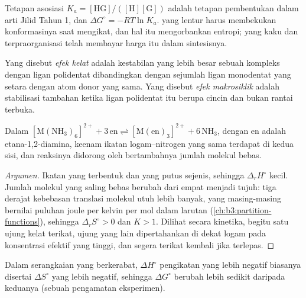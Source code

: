 Tetapan asosiasi $K_a = [\mathrm{HG}]/([\mathrm H][\mathrm G])$ adalah tetapan pembentukan dalam arti
Jilid Tahun 1, dan $\Delta G^\circ = -RT\ln K_a$.  yang lentur harus membekukan
konformasinya saat mengikat, dan hal itu mengorbankan entropi;  yang kaku dan terpraorganisasi telah
membayar harga itu dalam sintesisnya.

\begin{definition}\label{def:b3:supramolecular:macrocyclic}
Yang disebut \emph{efek kelat} adalah kestabilan yang lebih besar sebuah
kompleks dengan ligan polidentat dibandingkan dengan sejumlah ligan
monodentat yang setara dengan atom donor yang sama. Yang disebut \emph{efek
makrosiklik} adalah stabilisasi tambahan ketika
ligan polidentat itu berupa cincin dan bukan rantai terbuka.
\end{definition}

\begin{proposition}\label{prop:b3:supramolecular:chelate-entropy}
Dalam $\mathrm{[M(NH_3)_6]^{2+} + 3\,en \rightleftharpoons [M(en)_3]^{2+} + 6\,NH_3}$, dengan en adalah etana-1,2-diamina, keenam
ikatan logam--nitrogen yang sama terdapat di kedua sisi, dan reaksinya didorong oleh
bertambahnya jumlah molekul bebas.
\end{proposition}

\begin{proof}[Argumen]
Ikatan yang terbentuk dan yang putus sejenis, sehingga $\Delta_rH^\circ$ kecil. Jumlah
molekul yang saling bebas berubah dari empat menjadi tujuh: tiga derajat kebebasan
translasi molekul utuh lebih banyak, yang masing-masing bernilai puluhan joule per kelvin
per mol dalam larutan (\cref{ch:b3:partition-functions}), sehingga $\Delta_rS^\circ > 0$ dan $K > 1$.
Dilihat secara kinetika, begitu satu ujung kelat terikat, ujung yang lain dipertahankan di dekat
logam pada konsentrasi efektif yang tinggi, dan segera terikat kembali jika terlepas.
\end{proof}

\begin{proposition}\label{prop:b3:supramolecular:compensation}
Dalam serangkaian  yang berkerabat, $\Delta H^\circ$ pengikatan yang lebih negatif
biasanya disertai $\Delta S^\circ$ yang lebih negatif, sehingga $\Delta G^\circ$ berubah lebih sedikit daripada keduanya (sebuah
pengamatan eksperimen).
\end{proposition}

